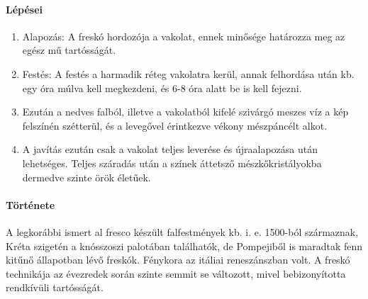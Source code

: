 	\paragraph{Lépései}
	
	\begin{enumerate}
		\item Alapozás: A freskó hordozója a vakolat, ennek minősége határozza meg az egész mű tartósságát.
	
		\item Festés: A festés a harmadik réteg vakolatra kerül, annak felhordása után kb. egy óra múlva kell megkezdeni, és 6-8 óra alatt be is kell fejezni. 
		
		\item Ezután a nedves falból, illetve a vakolatból kifelé szivárgó meszes víz a kép felszínén szétterül, és a levegővel érintkezve vékony mészpáncélt alkot.
		
		\item A javítás ezután csak a vakolat teljes leverése és újraalapozása után lehetséges. Teljes száradás után a színek áttetsző mészkőkristályokba dermedve szinte örök életűek.
	\end{enumerate}

\paragraph{Története}

	A legkorábbi ismert al fresco készült falfestmények kb. i. e. 1500-ból származnak, Kréta szigetén a knósszoszi palotában találhatók, de Pompejiből is maradtak fenn kitűnő állapotban lévő freskók. Fénykora az itáliai reneszánszban volt. A freskó technikája az évezredek során szinte semmit se változott, mivel bebizonyította rendkívüli tartósságát.

